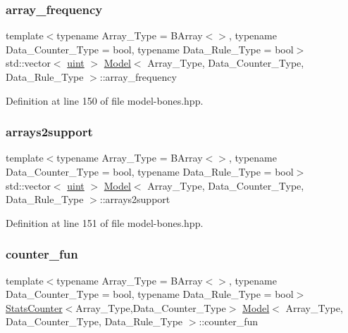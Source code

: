 \subsubsection{\texorpdfstring{array\+\_\+frequency}{array\_frequency}}
{\footnotesize\ttfamily template$<$typename Array\+\_\+\+Type = B\+Array$<$$>$, typename Data\+\_\+\+Counter\+\_\+\+Type = bool, typename Data\+\_\+\+Rule\+\_\+\+Type = bool$>$ \\
std\+::vector$<$ \hyperlink{typedefs_8hpp_a91ad9478d81a7aaf2593e8d9c3d06a14}{uint} $>$ \hyperlink{class_model}{Model}$<$ Array\+\_\+\+Type, Data\+\_\+\+Counter\+\_\+\+Type, Data\+\_\+\+Rule\+\_\+\+Type $>$\+::array\+\_\+frequency}



Definition at line 150 of file model-\/bones.\+hpp.

\mbox{\label{class_model_a038858e9cd8e396412c3867113a149e7}} 
\subsubsection{\texorpdfstring{arrays2support}{arrays2support}}
{\footnotesize\ttfamily template$<$typename Array\+\_\+\+Type = B\+Array$<$$>$, typename Data\+\_\+\+Counter\+\_\+\+Type = bool, typename Data\+\_\+\+Rule\+\_\+\+Type = bool$>$ \\
std\+::vector$<$ \hyperlink{typedefs_8hpp_a91ad9478d81a7aaf2593e8d9c3d06a14}{uint} $>$ \hyperlink{class_model}{Model}$<$ Array\+\_\+\+Type, Data\+\_\+\+Counter\+\_\+\+Type, Data\+\_\+\+Rule\+\_\+\+Type $>$\+::arrays2support}



Definition at line 151 of file model-\/bones.\+hpp.

\mbox{\label{class_model_a2bb5ec8af1a49bcb2da6c5f9f2374b15}} 
\subsubsection{\texorpdfstring{counter\+\_\+fun}{counter\_fun}}
{\footnotesize\ttfamily template$<$typename Array\+\_\+\+Type = B\+Array$<$$>$, typename Data\+\_\+\+Counter\+\_\+\+Type = bool, typename Data\+\_\+\+Rule\+\_\+\+Type = bool$>$ \\
\hyperlink{class_stats_counter}{Stats\+Counter}$<$Array\+\_\+\+Type,Data\+\_\+\+Counter\+\_\+\+Type$>$ \hyperlink{class_model}{Model}$<$ Array\+\_\+\+Type, Data\+\_\+\+Counter\+\_\+\+Type, Data\+\_\+\+Rule\+\_\+\+Type $>$\+::counter\+\_\+fun}



